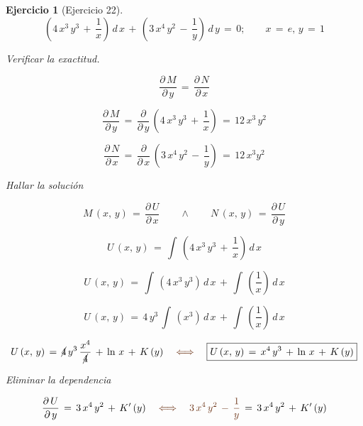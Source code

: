 \documentclass[a4paper,11pt]{book}
\newtheorem{ejer}{Ejercicio}[section]
\begin{document}
\begin{ejer}[Ejercicio 22] 

  $$\left(4\,x^{3}\,y^{3}\,+\,\dfrac{1}{x} \right)\,d\,x\,+\,\left(3\,x^{4}\,y^{2}\,-\,\dfrac{1}{y} \right)\,d\,y\,=\,0; \qquad x\,=\,e, \, y\,=\,1$$ 

  



  

 Verificar la exactitud. 

  

$$\dfrac{\partial\,M}{\partial\,y}\,=\,\dfrac{\partial\,N}{\partial\,x}$$ 

  

$$\dfrac{\partial\,M}{\partial\,y}\,=\,\dfrac{\partial}{\partial\,y}\,\left(4\,x^{3}\,y^{3}\,+\,\dfrac{1}{x} \right)\,=\,\boxed{12\,x^{3}\,y^{2}}$$ 

  

$$\dfrac{\partial\,N}{\partial\,x}\,=\,\dfrac{\partial}{\partial\,x}\,\left(3\,x^{4}\,y^{2}\,-\,\dfrac{1}{y} \right)\,=\,\boxed{12\,x^{3}y^{2}} $$ 

  

 Hallar la solución 

  

$$\boxed{M\,(x,\,y)\,=\,\dfrac{\partial\,U}{\partial\,x}} \qquad \wedge \qquad \boxed{N\,(x,\,y)\,=\,\dfrac{\partial\,U}{\partial\,y}}$$  

  

$$U\,(x,\,y)\,=\,\int\,\left(4\,x^{3}\,y^{3}\,+\,\dfrac{1}{x} \right)\,d\,x$$ 

  

$$U\,(x,\,y)\,=\,\int\,\left(4\,x^{3}\,y^{3} \right)\,d\,x\,+\,\int\,\left(\dfrac{1}{x} \right)\,d\,x$$ 

  

$$U\,(x,\,y)\,=\,4\,y^{3}\,\int\,\left(x^{3} \right)\,d\,x\,+\,\int\,\left(\dfrac{1}{x} \right)\,d\,x $$ 

  

$$U\,(x,\,y)\,=\,\cancel{4}\,y^{3}\,\dfrac{x^{4}}{\cancel{4}}\,+\,\ln\,x\,+\,K\,(y) \quad \textcolor{auburn}{\iff} \quad \boxed{U\,(x,\,y)\,=\,x^{4}\,y^{3}\,+\,\ln\,x\,+\,K\,(y)} $$ 

  

 Eliminar la dependencia 

  

$$\dfrac{\partial\,U}{\partial\,y}\,=\, 3\,x^{4}\,y^{2}\,+\,K'\,(y) \quad \textcolor{auburn}{\iff} \quad \textcolor{auburn}{3\,x^{4}\,y^{2}\,-\,\dfrac{1}{y}}\,=\,3\,x^{4}\,y^{2}\,+\,K'\,(y)$$ 


\end{ejer}
\end{document}
